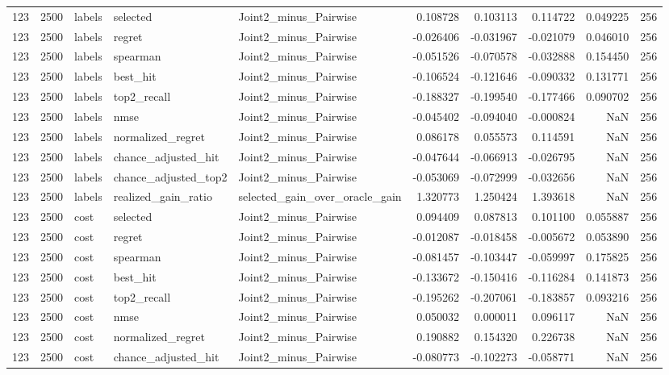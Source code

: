\begin{tabular}{rrlllrrrrr}
123 & 2500 & labels & selected & Joint2_minus_Pairwise & 0.108728 & 0.103113 & 0.114722 & 0.049225 & 256 \\
123 & 2500 & labels & regret & Joint2_minus_Pairwise & -0.026406 & -0.031967 & -0.021079 & 0.046010 & 256 \\
123 & 2500 & labels & spearman & Joint2_minus_Pairwise & -0.051526 & -0.070578 & -0.032888 & 0.154450 & 256 \\
123 & 2500 & labels & best_hit & Joint2_minus_Pairwise & -0.106524 & -0.121646 & -0.090332 & 0.131771 & 256 \\
123 & 2500 & labels & top2_recall & Joint2_minus_Pairwise & -0.188327 & -0.199540 & -0.177466 & 0.090702 & 256 \\
123 & 2500 & labels & nmse & Joint2_minus_Pairwise & -0.045402 & -0.094040 & -0.000824 & NaN & 256 \\
123 & 2500 & labels & normalized_regret & Joint2_minus_Pairwise & 0.086178 & 0.055573 & 0.114591 & NaN & 256 \\
123 & 2500 & labels & chance_adjusted_hit & Joint2_minus_Pairwise & -0.047644 & -0.066913 & -0.026795 & NaN & 256 \\
123 & 2500 & labels & chance_adjusted_top2 & Joint2_minus_Pairwise & -0.053069 & -0.072999 & -0.032656 & NaN & 256 \\
123 & 2500 & labels & realized_gain_ratio & selected_gain_over_oracle_gain & 1.320773 & 1.250424 & 1.393618 & NaN & 256 \\
123 & 2500 & cost & selected & Joint2_minus_Pairwise & 0.094409 & 0.087813 & 0.101100 & 0.055887 & 256 \\
123 & 2500 & cost & regret & Joint2_minus_Pairwise & -0.012087 & -0.018458 & -0.005672 & 0.053890 & 256 \\
123 & 2500 & cost & spearman & Joint2_minus_Pairwise & -0.081457 & -0.103447 & -0.059997 & 0.175825 & 256 \\
123 & 2500 & cost & best_hit & Joint2_minus_Pairwise & -0.133672 & -0.150416 & -0.116284 & 0.141873 & 256 \\
123 & 2500 & cost & top2_recall & Joint2_minus_Pairwise & -0.195262 & -0.207061 & -0.183857 & 0.093216 & 256 \\
123 & 2500 & cost & nmse & Joint2_minus_Pairwise & 0.050032 & 0.000011 & 0.096117 & NaN & 256 \\
123 & 2500 & cost & normalized_regret & Joint2_minus_Pairwise & 0.190882 & 0.154320 & 0.226738 & NaN & 256 \\
123 & 2500 & cost & chance_adjusted_hit & Joint2_minus_Pairwise & -0.080773 & -0.102273 & -0.058771 & NaN & 256 \\

\end{tabular}
